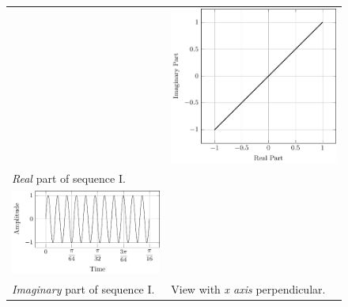 \documentclass[../../course]{subfiles}
\begin{document}
\begin{figure} [H]
\begin{NiceTabularX} {\textwidth} {
            *{2}{>{\centering\arraybackslash}X}
        }
        &

         {
             {
                \includegraphics[height = \textheight] {tikzpics/plotFrontViewComplexI.pdf}
            }
        }

        \\

         {\emph{Real} part of sequence I.}
        \label{plt:realCmplxI}

        &
        \\

         {
             {
                \includegraphics[height = \textheight] {tikzpics/plotShortX3.pdf}
            }
        }

        &
        \\

         {\emph{Imaginary} part of sequence I.}
        \label{plt:imagCmplxI}

        &

         {View with \emph{x axis} perpendicular.}
        \label{plt:frontViewCmplxI}

        \\

    \end{NiceTabularX}

\end{figure}
\end{document}
